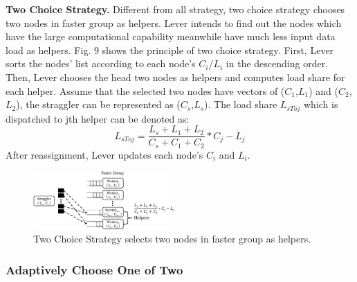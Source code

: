   \textbf{Two Choice Strategy.} Different from all strategy, two choice strategy chooses two nodes in faster group as helpers. Lever intends to find out the nodes which have the large computational capability meanwhile have much less input data load as helpers. Fig. 9 shows the principle of two choice strategy. First, Lever sorts the nodes' list according to each node's \emph{$C_i$}/\emph{$L_i$} in the descending order. Then, Lever chooses the head two nodes as helpers and computes load share for each helper. Assume that the selected two nodes have vectors of (\emph{$C_1$},\emph{$L_1$}) and (\emph{$C_2$},\emph{$L_2$}), the straggler can be represented as (\emph{$C_s$},\emph{$L_s$}). The load share \emph{{$L_{sToj}$}} which is dispatched to jth helper can be denoted as:
  \begin{equation}
  L_{sToj} = \frac{L_s + L_1 + L_2}{C_s + C_1 + C_2}*C_j - L_j
  \end{equation}
  After reassignment, Lever updates each node's $C_i$ and $L_i$.
  \begin{figure}[htbp]
    \centering
    \includegraphics[width=0.48\textwidth]{FigureS2}
    \caption{Two Choice Strategy selects two nodes in faster group as helpers.}
    \label{Fig. 9:}
  \end{figure}

\subsubsection{Adaptively Choose One of Two}


